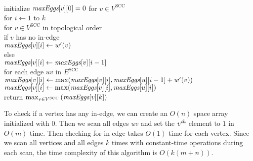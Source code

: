 \documentclass[11pt]{article}
\begin{document}
\begin{solution}
\begin{enumerate}[(a)]
\begin{algo}
\\	initialize $\emph{maxEggs}[v][0]=0$ for $v\in V^{\text{SCC}}$
\\	for $i\gets 1$ to $k$\+
\\	for $v\in V^{\text{SCC}}$ in topological order\+
\\	if $v$ has no in-edge\+
\\	$\emph{maxEggs}[v][i]\gets w'(v)$\-
\\	else\+
\\	$\emph{maxEggs}[v][i]\gets \emph{maxEggs}[v][i-1]$
\\	for each edge $uv$ in $E^{\text{SCC}}$\+
\\	$\emph{maxEggs}[v][i]\gets \max(\emph{maxEggs}[v][i], \emph{maxEggs}[u][i-1]+w'(v))$
\\	$\emph{maxEggs}[v][i]\gets \max(\emph{maxEggs}[v][i], \emph{maxEggs}[u][i])$\-\-\-\-
\\	return $\max_{v\in V^{\text{SCC}}}{(\emph{maxEggs}[v][k])}$
\end{algo}
To check if a vertex has any in-edge, we can create an $O(n)$ space array initialized with $0$. Then we scan all edges $uv$ and set the $v^{\emph{th}}$ element to $1$ in $O(m)$ time. Then checking for in-edge takes $O(1)$ time for each vertex. Since we scan all vertices and all edges $k$ times with constant-time operations during each scan, the time complexity of this algorithm is $O(k(m+n))$.
\end{enumerate}
\end{solution}
\end{document}
